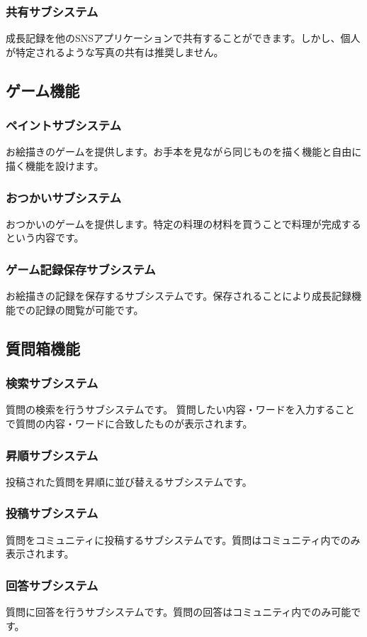 \documentclass[a4j]{jarticle}
\begin{document}
\subsubsection*{共有サブシステム} 
成長記録を他のSNSアプリケーションで共有することができます。しかし、個人が特定されるような写真の共有は推奨しません。 

\subsection{ゲーム機能} 
\subsubsection*{ペイントサブシステム} 
お絵描きのゲームを提供します。お手本を見ながら同じものを描く機能と自由に描く機能を設けます。
\subsubsection*{おつかいサブシステム}
おつかいのゲームを提供します。特定の料理の材料を買うことで料理が完成するという内容です。
\subsubsection*{ゲーム記録保存サブシステム}
お絵描きの記録を保存するサブシステムです。保存されることにより成長記録機能での記録の閲覧が可能です。

\subsection{質問箱機能} 
\subsubsection*{検索サブシステム}
質問の検索を行うサブシステムです。 質問したい内容・ワードを入力することで質問の内容・ワードに合致したものが表示されます。
\subsubsection*{昇順サブシステム}
投稿された質問を昇順に並び替えるサブシステムです。
\subsubsection*{投稿サブシステム}
質問をコミュニティに投稿するサブシステムです。質問はコミュニティ内でのみ表示されます。
\subsubsection*{回答サブシステム}
質問に回答を行うサブシステムです。質問の回答はコミュニティ内でのみ可能です。
\end{document}
